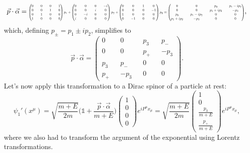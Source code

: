 \begin{equation*}
    \vec p\cdot\vec\alpha=\resizebox{0.92\hsize}{!}{$
    \begin{pmatrix}
        0&&0&&0&&1\\
        0&&0&&1&&0\\
        0&&1&&0&&0\\
        1&&0&&0&&0
    \end{pmatrix} p_1+
    \begin{pmatrix}
        0&&0&&0&&-i\\
        0&&0&&i&&0\\
        0&&-i&&0&&0\\
        i&&0&&0&&0
    \end{pmatrix} p_2 +
    \begin{pmatrix}
        0&&0&&1&&0\\
        0&&0&&0&&-1\\
        1&&0&&0&&0\\
        0&&-1&&0&&0
    \end{pmatrix} p_3=
    \begin{pmatrix}
        0&&0&&p_3&&p_1-ip_2\\
        0&&0&&p_1+ip_2&&-p_3\\
        p_3&&p_1-ip_2&&0&&0\\
        p_1+ip_2&&-p_3&&0&&0
    \end{pmatrix}  $},
\end{equation*}
which, defining $p_{\pm}=p_1\pm ip_{2}$, simplifies to
\begin{equation*}
    \vec p\cdot\vec\alpha=\begin{pmatrix}
        0&&0&&p_3&&p_-\\
        0&&0&&p_+&&-p_3\\
        p_3&&p_-&&0&&0\\
        p_+&&-p_3&&0&&0
    \end{pmatrix}.
\end{equation*}
Let's now apply this transformation to a Dirac spinor of a particle at rest:
\begin{equation*}
    \psi_1'(x^\mu)=\sqrt{\frac{m+E}{2m}}\bigg(\mathds{1}+\frac{\vec p\cdot\vec\alpha}{m+E}\bigg)\begin{pmatrix}
        1\\0\\0\\0
    \end{pmatrix}e^{iP^\mu x_\mu}=\sqrt{\frac{m+E}{2m}}\begin{pmatrix}
        1\\0\\\frac{p_3}{m+E}\\\frac{p_+}{m+E}
    \end{pmatrix}e^{iP^\mu x_\mu},
\end{equation*}
where we also had to transform the argument of the exponential using Lorentz transformations.
